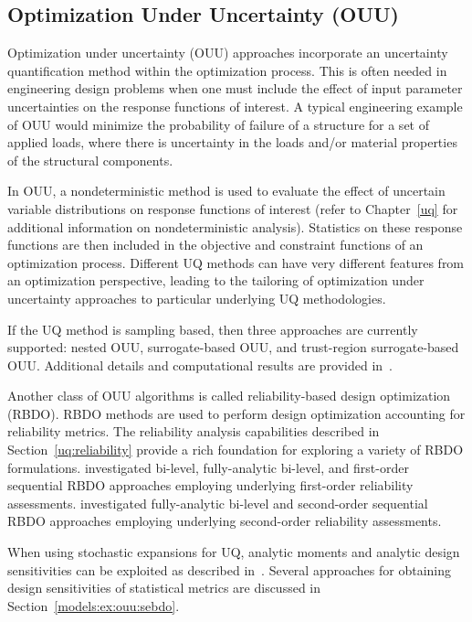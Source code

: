\subsection{Optimization Under Uncertainty (OUU)} \label{models:ex:ouu}

Optimization under uncertainty (OUU) approaches incorporate an
uncertainty quantification method within the optimization
process. This is often needed in engineering design problems when one
must include the effect of input parameter uncertainties on the
response functions of interest. A typical engineering example of OUU
would minimize the probability of failure of a structure for a set of
applied loads, where there is uncertainty in the loads and/or material
properties of the structural components.

In OUU, a nondeterministic method is used to evaluate the effect of
uncertain variable distributions on response functions of interest
(refer to Chapter~\ref{uq} for additional information on
nondeterministic analysis). Statistics on these response functions are
then included in the objective and constraint functions of an
optimization process.  Different UQ methods can have very different
features from an optimization perspective, leading to the tailoring of
optimization under uncertainty approaches to particular underlying UQ
methodologies.

If the UQ method is sampling based, then three approaches are
currently supported: nested OUU, surrogate-based OUU, and trust-region
surrogate-based OUU.  Additional details and computational results are
provided in~\cite{Eld02}.

Another class of OUU algorithms is called reliability-based design
optimization (RBDO).  RBDO methods are used to perform design
optimization accounting for reliability metrics.  The reliability
analysis capabilities described in Section~\ref{uq:reliability}
provide a rich foundation for exploring a variety of RBDO
formulations.  \cite{Eld05} investigated bi-level, fully-analytic
bi-level, and first-order sequential RBDO approaches employing
underlying first-order reliability assessments.
\cite{Eld06a} investigated fully-analytic bi-level and 
second-order sequential RBDO approaches employing underlying
second-order reliability assessments.  

When using stochastic expansions for UQ, analytic moments and
analytic design sensitivities can be exploited as described
in~\cite{Eld07}.  Several approaches for obtaining design
sensitivities of statistical metrics are discussed in 
Section~\ref{models:ex:ouu:sebdo}.

